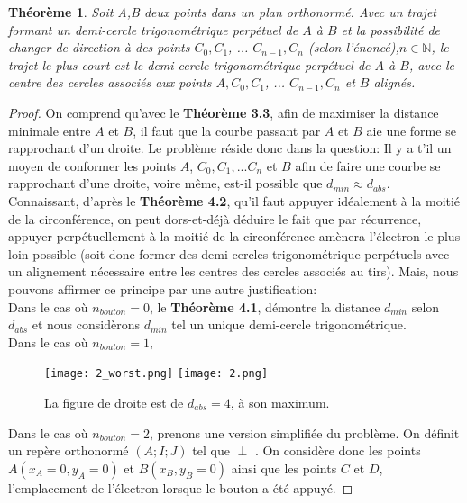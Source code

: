 \documentclass{amsart}
\newtheorem{theorem}{Théorème}[section]
\theoremstyle{definition}
\theoremstyle{remark}
\numberwithin{equation}{section}
\renewcommand*{\overrightarrow}[1]{\vbox{\halign{##\cr 
  \tiny\rightarrowfill\cr\noalign{\nointerlineskip\vskip1pt} 
  $#1\mskip2mu$\cr}}}
\begin{document}
\begin{theorem}
  Soit A,B deux points dans un plan orthonormé. Avec un trajet formant un demi-cercle trigonométrique perpétuel de $A$ à $B$ et la possibilité de changer de direction à des points $C_0, C_1$, ... $C_{n-1}, C_{n}$ (selon l'énoncé),$n\in\mathbb{N}$, le trajet le plus court
  est le demi-cercle trigonométrique perpétuel de $A$ à $B$, avec le centre des cercles associés aux points $A,C_0, C_1$, ... $C_{n-1}, C_{n}$ et $B$ alignés.
\end{theorem}

\begin{proof}
  On comprend qu'avec le \textbf{Théorème 3.3}, afin de maximiser la distance minimale entre $A$ et $B$, il faut que la courbe passant par $A$ et $B$ aie une forme se rapprochant d'un droite. 
  Le problème réside donc dans la question: Il y a t'il un moyen de conformer les points $A$, $C_0, C_1, ... C_n$ et $B$ afin de faire une courbe se rapprochant d'une droite, voire même, est-il possible que $d_{min}\approx d_{abs}$.\\

  Connaissant, d'après le \textbf{Théorème 4.2}, qu'il faut appuyer idéalement à la moitié de la circonférence, on peut dors-et-déjà déduire le fait que par récurrence, appuyer perpétuellement à la moitié de la circonférence amènera l'électron le plus loin 
  possible (soit donc former des demi-cercles trigonométrique perpétuels avec un alignement nécessaire entre les centres des cercles associés au tirs). Mais, nous pouvons affirmer ce principe par une autre justification:\\

  Dans le cas où $n_{bouton}=0$, le \textbf{Théorème 4.1}, démontre la distance $d_{min}$ selon $d_{abs}$ et nous considèrons $d_{min}$ tel un unique demi-cercle trigonométrique.\\

  Dans le cas où $n_{bouton}=1,$

  \begin{figure}[H]
  \centering
  \texttt{[image: 2\_worst.png]}
  \texttt{[image: 2.png]}
  \caption{La figure de droite est de $d_{abs}=4$, à son maximum.}
\end{figure}
  
  Dans le cas où $n_{bouton}=2$, prenons une version simplifiée du problème. On définit un repère orthonormé $(A;I;J)$ tel que \overrightarrow{AJ} $\perp$ \overrightarrow{AB}. On considère donc les points $A(x_A=0,y_A=0)$ et $B(x_B,y_B=0)$ ainsi que les points $C$ et $D$, l'emplacement de l'électron lorsque le bouton a été appuyé.
  

\end{proof}
\end{document}
